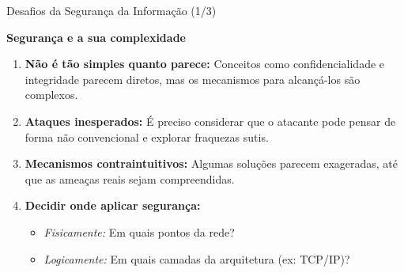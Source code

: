 \begin{frame}{Desafios da Segurança da Informação (1/3)}

\textbf{Segurança e a sua complexidade}

\vspace{0.5em}
\begin{enumerate}
  \item \textbf{Não é tão simples quanto parece:} Conceitos como confidencialidade e integridade parecem diretos, mas os mecanismos para alcançá-los são complexos.
  
  \item \textbf{Ataques inesperados:} É preciso considerar que o atacante pode pensar de forma não convencional e explorar fraquezas sutis.
  
  \item \textbf{Mecanismos contraintuitivos:} Algumas soluções parecem exageradas, até que as ameaças reais sejam compreendidas.
  
  \item \textbf{Decidir onde aplicar segurança:}
    \begin{itemize}
      \item \textit{Fisicamente:} Em quais pontos da rede?
      \item \textit{Logicamente:} Em quais camadas da arquitetura (ex: TCP/IP)?
    \end{itemize}
\end{enumerate}

\end{frame}


